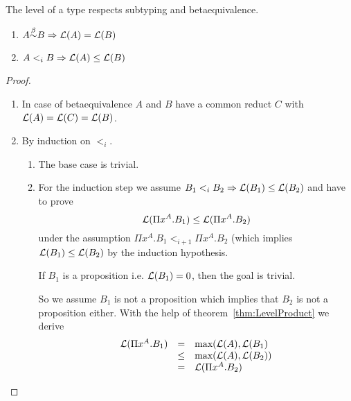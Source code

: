 \begin{theorem}
    \label{thm:LevelSubtypeEquivalence}
    The level of a type respects subtyping and betaequivalence.
    \begin{enumerate}
        \item $ A {\stackrel{\beta}{\sim}} B \Rightarrow {\cal L}(A) = {\cal L}(B)$

        \item $ A <_i B \Rightarrow {\cal L}(A) \le {\cal L}(B) $
    \end{enumerate}

    \begin{proof}
        \ \begin{enumerate}
            \item In case of betaequivalence $A$ and $B$ have a common reduct
                $C$ with ${\cal L}(A) = {\cal L}(C) = {\cal L}(B)$.

            \item By induction on $<_i$.
                \begin{enumerate}
                    \item The base case is trivial.

                    \item For the induction step we assume $B_1 <_i B_2 \Rightarrow
                        {\cal L}(B_1) \le {\cal L}(B_2)$ and have to prove
                        $$
                            {\cal L}(\Pi x^A.B_1) \le {\cal L}(\Pi x^A. B_2)
                        $$
                        under the assumption $ \Pi x^A. B_1 <_{i+1} \Pi x^A.
                        B_2$ (which implies ${\cal L}(B_1) \le {\cal L}(B_2)$ by the
                        induction hypothesis.

                        If $B_1$ is a proposition i.e. ${\cal L}(B_1) = 0$, then
                        the goal is trivial.

                        So we assume $B_1$ is not a
                        proposition which implies that $B_2$ is not a
                        proposition either. With the help of
                        theorem~\ref{thm:LevelProduct} we derive
                        $$
                        \begin{array}{lll}
                            {\cal L}(\Pi x^A. B_1)
                            & = & {\text{max}}({\cal L}(A), {\cal L}(B_1)
                            \\
                            & \le & {\text{max}}({\cal L}(A), {\cal L}(B_2))
                            \\
                            & = & {\cal L}(\Pi x^A. B_2)
                        \end{array}
                        $$
                \end{enumerate}
        \end{enumerate}
    \end{proof}
\end{theorem}



